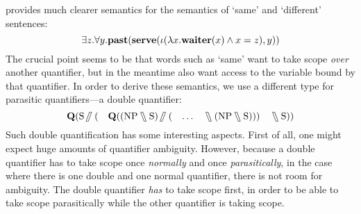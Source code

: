 \documentclass[a4paper]{article}
\begin{document}
\citet{kiselyov2015b} provides much clearer semantics for the semantics
of `same' and `different' sentences:
\[
  \exists{z}.\forall{y}.\PAST(\SERVE(\iota(\lambda{x}.\WAITER(x)\wedge{x=z}),y))
\]
The crucial point seems to be that words such as `same' want to take
scope \emph{over} another quantifier, but in the meantime also want
access to the variable bound by that quantifier. In order to derive
these semantics, we use a different type for parasitic quantifiers---a
double quantifier:
\[
  \q[\S\himpl(\quad{\q[(\NP\himpr\S)\himpl(\quad{\ldots}\quad\himpr(\NP\himpr\S))]}\quad\himpr\S)]
\]
Such double quantification has some interesting aspects. First of all,
one might expect huge amounts of quantifier ambiguity. However,
because a double quantifier has to take scope once \emph{normally} and
once \emph{parasitically}, in the case where there is one double and
one normal quantifier, there is not room for ambiguity. The double
quantifier \emph{has} to take scope first, in order to be able to take
scope parasitically while the other quantifier is taking scope.
\end{document}

